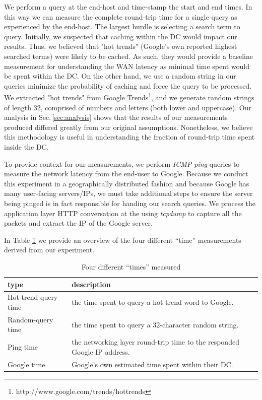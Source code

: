 We perform a query at the end-host and time-stamp the start and end times. In this way we can measure the complete round-trip time for a single query as experienced by the end-host. The largest hurdle is selecting a search term to query. Initially, we suspected that caching within the DC would impact our results. Thus, we believed that "hot trends" (Google's own reported highest searched terms) were likely to be cached. As such, they would provide a baseline measurement for understanding the WAN latency as minimal time spent would be spent within the DC. On the other hand, we use a random string in our  queries minimize the probability of caching and force the query to be processed. We extracted "hot trends" from Google Trends\footnote{http://www.google.com/trends/hottrends}, and we generate random strings of length 32, comprised of numbers and letters (both lower and uppercase). Our analysis in Sec.\,\ref{sec:analysis} shows that the results of our measurements produced differed greatly from our original assumptions. Nonetheless, we believe this methodology is useful in understanding the fraction of round-trip time spent inside the DC.

To provide context for our measurements, we perform {\it ICMP ping} queries to measure the network latency from the end-user to Google. Because we conduct this experiment in a geographically distributed fashion and because Google has many user-facing servers/IPs, we must take additional steps to ensure the server being pinged is in fact responsible for handing our search queries. We process the application layer HTTP conversation at the using {\it tcpdump} to capture all the packets and extract the IP of the Google server.
 
In Table \ref{tab:DC_method} we provide an overview of the four different ``time'' measurements derived from our experiment.

\begin{table}
  \begin{tabular}{p{2.8cm} | p{5cm}}
    \hline
    type & description \\
    \hline
    Hot-trend-query time & the time spent to query a hot trend word to Google. \\
    Random-query time & the time spent to query a 32-character random string.  \\
    Ping time & the networking layer round-trip time to the responded Google IP address. \\
    Google time & Google's own estimated time spent within their DC. \\
    \hline
  \end{tabular}
  \caption{Four different ``times'' measured}
  \label{tab:DC_method}
\end{table}



